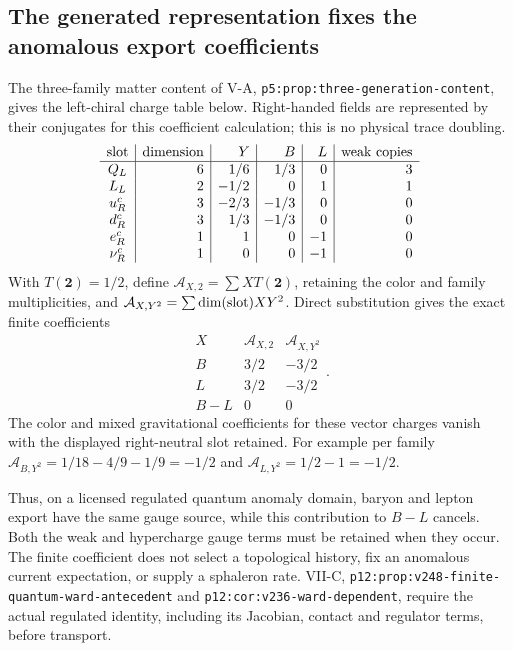 \documentclass[12pt,a4paper]{article}
\begin{document}
\subsection{The generated representation fixes the anomalous export coefficients}
The three-family matter content of V-A,
\texttt{p5:prop:three-generation-content}, gives the left-chiral charge
table below. Right-handed fields are represented by their conjugates for
this coefficient calculation; this is no physical trace doubling.
\[
\begin{array}{c|r|r|r|r|r}
 \hbox{slot}&\hbox{dimension}&Y&B&L&\hbox{weak copies}\\\hline
 Q_L&6&1/6&1/3&0&3\\
 L_L&2&-1/2&0&1&1\\
 u_R^c&3&-2/3&-1/3&0&0\\
 d_R^c&3&1/3&-1/3&0&0\\
 e_R^c&1&1&0&-1&0\\
 \nu_R^c&1&0&0&-1&0
\end{array}
\]
With $T(\mathbf2)=1/2$, define
$\mathcal A_{X,2}=\sum X T(\mathbf2)$, retaining the color and family
multiplicities, and $\mathcal A_{X,Y^2}=\sum \dim(\hbox{slot})XY^2$.
Direct substitution gives the exact finite coefficients
\begin{equation}
 \begin{array}{c|rr}
 X&\mathcal A_{X,2}&\mathcal A_{X,Y^2}\\\hline
 B&3/2&-3/2\\
 L&3/2&-3/2\\
 B-L&0&0
 \end{array}.
 \label{p5a:v2171:eq:exportcoefficients}
\end{equation}
The color and mixed gravitational coefficients for these vector charges
vanish with the displayed right-neutral slot retained.
For example per family
$\mathcal A_{B,Y^2}=1/18-4/9-1/9=-1/2$ and
$\mathcal A_{L,Y^2}=1/2-1=-1/2$.

Thus, on a licensed regulated quantum anomaly domain, baryon and lepton
export have the same gauge source, while this contribution to $B-L$
cancels. Both the weak and hypercharge gauge terms must be retained when
they occur. The finite coefficient does not select a topological history,
fix an anomalous current expectation, or supply a sphaleron rate.
VII-C, \texttt{p12:prop:v248-finite-quantum-ward-antecedent} and
\texttt{p12:cor:v236-ward-dependent}, require the actual regulated identity,
including its Jacobian, contact and regulator terms, before transport.
\end{document}
